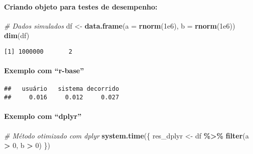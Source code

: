 \documentclass[
]{article}
\newenvironment{Shaded}{\begin{snugshade}}{\end{snugshade}}
\newcommand{\AttributeTok}[1]{\textcolor[rgb]{0.13,0.29,0.53}{#1}}
\newcommand{\CommentTok}[1]{\textcolor[rgb]{0.56,0.35,0.01}{\textit{#1}}}
\newcommand{\DecValTok}[1]{\textcolor[rgb]{0.00,0.00,0.81}{#1}}
\newcommand{\FloatTok}[1]{\textcolor[rgb]{0.00,0.00,0.81}{#1}}
\newcommand{\FunctionTok}[1]{\textcolor[rgb]{0.13,0.29,0.53}{\textbf{#1}}}
\newcommand{\NormalTok}[1]{#1}
\newcommand{\OtherTok}[1]{\textcolor[rgb]{0.56,0.35,0.01}{#1}}
\newcommand{\SpecialCharTok}[1]{\textcolor[rgb]{0.81,0.36,0.00}{\textbf{#1}}}
\begin{document}
\paragraph{Criando objeto para testes de
desempenho:}\label{criando-objeto-para-testes-de-desempenho}

\begin{Shaded}
\begin{Highlighting}[]
\CommentTok{\# Dados simulados}
\NormalTok{df }\OtherTok{\textless{}{-}} \FunctionTok{data.frame}\NormalTok{(}\AttributeTok{a =} \FunctionTok{rnorm}\NormalTok{(}\FloatTok{1e6}\NormalTok{), }\AttributeTok{b =} \FunctionTok{rnorm}\NormalTok{(}\FloatTok{1e6}\NormalTok{))}
\FunctionTok{dim}\NormalTok{(df)}
\end{Highlighting}
\end{Shaded}

\begin{verbatim}
[1] 1000000       2
\end{verbatim}

\paragraph{Exemplo com ``r-base''}\label{exemplo-com-r-base}

\begin{Shaded}
\end{Shaded}

\begin{verbatim}
##   usuário   sistema decorrido 
##     0.016     0.012     0.027
\end{verbatim}

\paragraph{Exemplo com ``dplyr''}\label{exemplo-com-dplyr}

\begin{Shaded}
\begin{Highlighting}[]
\CommentTok{\# Método otimizado com dplyr}
\FunctionTok{system.time}\NormalTok{(\{}
\NormalTok{  res\_dplyr }\OtherTok{\textless{}{-}}\NormalTok{ df }\SpecialCharTok{\%\textgreater{}\%}
    \FunctionTok{filter}\NormalTok{(a }\SpecialCharTok{\textgreater{}} \DecValTok{0}\NormalTok{, b }\SpecialCharTok{\textgreater{}} \DecValTok{0}\NormalTok{)}
\NormalTok{\})}
\end{Highlighting}
\end{Shaded}
\end{document}

